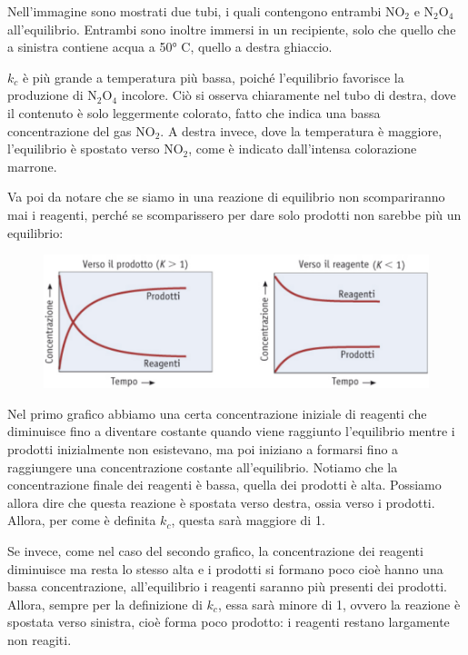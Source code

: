 Nell'immagine sono mostrati due tubi, i quali contengono entrambi NO$_2$ e N$_2$O$_4$ all'equilibrio. Entrambi sono inoltre immersi in un recipiente, solo che quello che a sinistra contiene acqua a 50° C, quello a destra ghiaccio.

$k_c$ è più grande a temperatura più bassa, poiché l'equilibrio favorisce la produzione di N$_2$O$_4$ incolore. Ciò si osserva chiaramente nel tubo di destra, dove il contenuto è solo leggermente colorato, fatto che indica una bassa concentrazione del gas NO$_2$. A destra invece, dove la temperatura è maggiore, l'equilibrio è spostato verso NO$_2$, come è indicato dall'intensa colorazione marrone.

\vspace{0.2cm}Va poi da notare che se siamo in una reazione di equilibrio non scompariranno mai i reagenti, perché se scomparissero per dare solo prodotti non sarebbe più un equilibrio:

\begin{figure}[H]
    \centering
    \includegraphics[width=16cm]{immagini/reazioni_equilibrio_spostato.png}
\end{figure}

Nel primo grafico abbiamo una certa concentrazione iniziale di reagenti che diminuisce fino a diventare costante quando viene raggiunto l'equilibrio mentre i prodotti inizialmente non esistevano, ma poi iniziano a formarsi fino a raggiungere una concentrazione costante all'equilibrio. Notiamo che la concentrazione finale dei reagenti è bassa, quella dei prodotti è alta. Possiamo allora dire che questa reazione è spostata verso destra, ossia verso i prodotti. Allora, per come è definita $k_c$, questa sarà maggiore di 1.

Se invece, come nel caso del secondo grafico, la concentrazione dei reagenti diminuisce ma resta lo stesso alta e i prodotti si formano poco cioè hanno una bassa concentrazione, all'equilibrio i reagenti saranno più presenti dei prodotti. Allora, sempre per la definizione di $k_c$, essa sarà minore di 1, ovvero la reazione è spostata verso sinistra, cioè forma poco prodotto: i reagenti restano largamente non reagiti.

